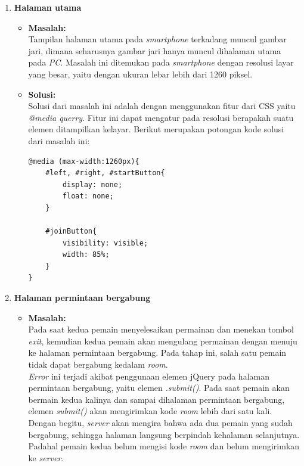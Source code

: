\begin{enumerate}
	\item \textbf{Halaman utama}
	\begin{itemize}
		\item \textbf{Masalah:} \\
		Tampilan halaman utama pada \textit{smartphone} terkadang muncul gambar jari, dimana seharusnya gambar jari hanya muncul dihalaman utama pada \textit{PC}. Masalah ini ditemukan pada \textit{smartphone} dengan resolusi layar yang besar, yaitu dengan ukuran lebar lebih dari 1260 piksel.
		
		\item \textbf{Solusi:} \\
		Solusi dari masalah ini adalah dengan menggunakan fitur dari CSS yaitu \textit{@media querry}. Fitur ini dapat mengatur pada resolusi berapakah suatu elemen ditampilkan kelayar. Berikut merupakan potongan kode solusi dari masalah ini:
		
\begin{lstlisting}[caption={Fitur CSS \textit{@media querry}}, label={lst:mediaQuerry},captionpos=b]
@media (max-width:1260px){
	#left, #right, #startButton{
		display: none;
		float: none;
	}
			
	#joinButton{
		visibility: visible;
		width: 85%;
	}
}
\end{lstlisting}
	\end{itemize}

	\item \textbf{Halaman permintaan bergabung}
	\begin{itemize}
		\item \textbf{Masalah:} \\
		Pada saat kedua pemain menyelesaikan permainan dan menekan tombol \textit{exit}, kemudian kedua pemain akan mengulang permainan dengan menuju ke halaman permintaan bergabung. Pada tahap ini, salah satu pemain tidak dapat bergabung kedalam \textit{room}. \\
		
		\textit{Error} ini terjadi akibat penggunaan elemen jQuery pada halaman permintaan bergabung, yaitu elemen \textit{.submit()}. Pada saat pemain akan bermain kedua kalinya dan sampai dihalaman permintaan bergabung, elemen \textit{submit()} akan mengirimkan kode \textit{room} lebih dari satu kali. Dengan begitu, \textit{server} akan mengira bahwa ada dua pemain yang sudah bergabung, sehingga halaman langsung berpindah kehalaman selanjutnya. Padahal pemain kedua belum mengisi kode \textit{room} dan belum mengirimkan ke \textit{server}.
		

\end{itemize}
\end{enumerate}
